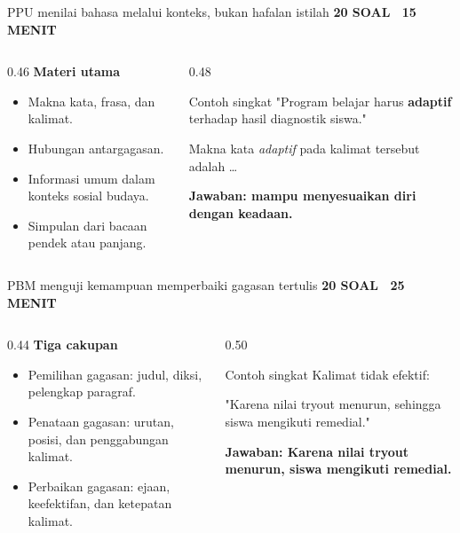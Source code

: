 \documentclass[aspectratio=169,11pt]{beamer}
\newcommand{\kicker}[1]{%
  {\color{StudentCyan}\bfseries\fontsize{10.5}{13}\selectfont\MakeUppercase{#1}}\par\vspace{0.11cm}
}
\newcommand{\answer}[1]{%
  \vspace{0.10cm}
  {\color{StudentGreen}\bfseries\fontsize{11.5}{14}\selectfont Jawaban: #1}
}
\begin{document}
\begin{frame}{PPU menilai bahasa melalui konteks, bukan hafalan istilah}
  \kicker{20 Soal \textbar\ 15 Menit}
  \begin{columns}[T,onlytextwidth]
    \begin{column}{0.46\textwidth}
      {\color{StudentBlue}\bfseries Materi utama}\par
      \begin{itemize}
        \item Makna kata, frasa, dan kalimat.
        \item Hubungan antargagasan.
        \item Informasi umum dalam konteks sosial budaya.
        \item Simpulan dari bacaan pendek atau panjang.
      \end{itemize}
    \end{column}
    \begin{column}{0.48\textwidth}
      \begin{block}{Contoh singkat}
        "Program belajar harus \textbf{adaptif} terhadap hasil diagnostik siswa."

        Makna kata \textit{adaptif} pada kalimat tersebut adalah \ldots

        \answer{mampu menyesuaikan diri dengan keadaan.}
      \end{block}
    \end{column}
  \end{columns}
\end{frame}

\begin{frame}{PBM menguji kemampuan memperbaiki gagasan tertulis}
  \kicker{20 Soal \textbar\ 25 Menit}
  \begin{columns}[T,onlytextwidth]
    \begin{column}{0.44\textwidth}
      {\color{StudentBlue}\bfseries Tiga cakupan}\par
      \begin{itemize}
        \item Pemilihan gagasan: judul, diksi, pelengkap paragraf.
        \item Penataan gagasan: urutan, posisi, dan penggabungan kalimat.
        \item Perbaikan gagasan: ejaan, keefektifan, dan ketepatan kalimat.
      \end{itemize}
    \end{column}
    \begin{column}{0.50\textwidth}
      \begin{block}{Contoh singkat}
        Kalimat tidak efektif:

        "Karena nilai tryout menurun, sehingga siswa mengikuti remedial."

        \answer{Karena nilai tryout menurun, siswa mengikuti remedial.}
      \end{block}
    \end{column}
  \end{columns}
\end{frame}
\end{document}
